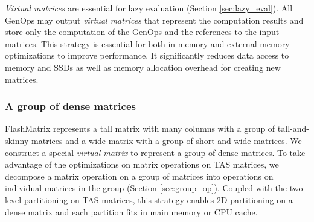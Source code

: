 \textit{Virtual matrices} are essential for lazy evaluation (Section
\ref{sec:lazy_eval}). All GenOps may output \textit{virtual matrices} that
represent the computation results and store only the computation of the GenOps
and the references to the input matrices. This strategy is
essential for both in-memory and external-memory optimizations to improve
performance. It significantly reduces data access to memory and SSDs as well as
memory allocation overhead for creating new matrices.




\subsubsection{A group of dense matrices} \label{sec:mat_group}
FlashMatrix represents a tall matrix with many columns with a group of
tall-and-skinny matrices and a wide matrix with a group of short-and-wide
matrices. We construct a special \textit{virtual matrix} to represent
a group of dense matrices. To take advantage of the optimizations on matrix
operations on TAS matrices, we decompose a matrix operation on a group of
matrices into operations on individual matrices in the group (Section
\ref{sec:group_op}).
Coupled with the two-level partitioning on TAS matrices, this strategy enables
2D-partitioning on a dense matrix and each partition fits in main memory
or CPU cache.

